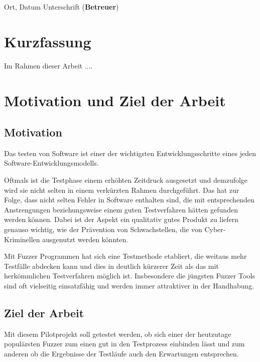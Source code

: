 \documentclass[12pt,a4paper]{scrreprt}
\begin{document}
\begin{minipage}{0.99\textwidth}

Ort, Datum \hspace{3cm} Unterschrift (\textbf{Betreuer})

\end{minipage}


\newpage
\chapter{Kurzfassung}
Im Rahmen dieser Arbeit ....


\newpage
\chapter{ Motivation und Ziel der Arbeit  }

\section{Motivation}

Das testen von Software ist einer der wichtigsten Entwicklungsschritte eines jeden Software-Entwicklungsmodells. 

Oftmals ist die Testphase einem erhöhten Zeitdruck ausgesetzt und demzufolge wird sie nicht selten in einem verkürzten Rahmen durchgeführt.
Das hat zur Folge, dass nicht selten Fehler in Software enthalten sind, die mit entsprechenden Anstrengungen beziehungsweise einem guten Testverfahren hätten gefunden werden können. Dabei ist der Aspekt ein qualitativ gutes Produkt zu liefern genauso wichtig, wie der Prävention von Schwachstellen, die von Cyber-Kriminellen ausgenutzt werden könnten. 

Mit Fuzzer Programmen hat sich eine Testmethode etabliert, die weitaus mehr Testfälle abdecken kann und dies in deutlich kürzerer Zeit als das mit herkömmlichen Testverfahren möglich ist.
Insbesondere die jüngsten Fuzzer Tools sind oft vielseitig einsatzfähig und werden immer attraktiver in der Handhabung.



\section{Ziel der Arbeit}

Mit diesem Pilotprojekt soll getestet werden, ob sich einer der heutzutage populärsten Fuzzer zum einen gut in den Testprozess einbinden lässt und zum anderen ob die Ergebnisse der Testläufe auch den Erwartungen entsprechen.
\end{document}
